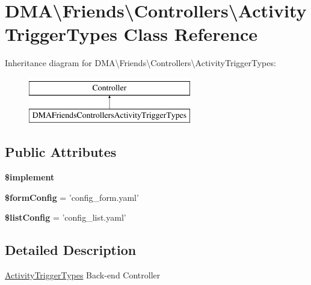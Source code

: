 \hypertarget{classDMA_1_1Friends_1_1Controllers_1_1ActivityTriggerTypes}{\section{D\-M\-A\textbackslash{}Friends\textbackslash{}Controllers\textbackslash{}Activity\-Trigger\-Types Class Reference}
\label{classDMA_1_1Friends_1_1Controllers_1_1ActivityTriggerTypes}
}
Inheritance diagram for D\-M\-A\textbackslash{}Friends\textbackslash{}Controllers\textbackslash{}Activity\-Trigger\-Types\-:\begin{figure}[H]
\begin{center}
\leavevmode
\includegraphics[height=2.000000cm]{d3/dbc/classDMA_1_1Friends_1_1Controllers_1_1ActivityTriggerTypes}
\end{center}
\end{figure}
\subsection*{Public Attributes}
\begin{DoxyCompactItemize}
\item 
{\bfseries \$implement}
\item 
\hypertarget{classDMA_1_1Friends_1_1Controllers_1_1ActivityTriggerTypes_add26deea49dcf3b76ef2dcae73249a34}{{\bfseries \$form\-Config} = 'config\-\_\-form.\-yaml'}\label{classDMA_1_1Friends_1_1Controllers_1_1ActivityTriggerTypes_add26deea49dcf3b76ef2dcae73249a34}

\item 
\hypertarget{classDMA_1_1Friends_1_1Controllers_1_1ActivityTriggerTypes_a4980b26c1a622da427205cdf840d9e43}{{\bfseries \$list\-Config} = 'config\-\_\-list.\-yaml'}\label{classDMA_1_1Friends_1_1Controllers_1_1ActivityTriggerTypes_a4980b26c1a622da427205cdf840d9e43}

\end{DoxyCompactItemize}


\subsection{Detailed Description}
\hyperlink{classDMA_1_1Friends_1_1Controllers_1_1ActivityTriggerTypes}{Activity\-Trigger\-Types} Back-\/end Controller 

